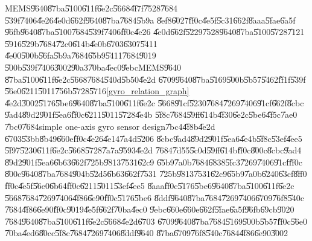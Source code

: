 MEMS\U{9640}\U{87ba}\U{5100}\U{611f}\U{6e2c}\U{5668}\U{4f7f}\U{7528}\U{7684}%
\U{539f}\U{7406}\U{4e26}\U{4e0d}\U{662f}\U{9640}\U{87ba}\U{7684}\U{5b9a}%
\U{8ef8}\U{6027}\U{ff0c}\U{4e5f}\U{5c31}\U{662f}\U{8aaa}\U{5fae}\U{6a5f}%
\U{96fb}\U{9640}\U{87ba}\U{5100}\U{7684}\U{539f}\U{7406}\U{ff0c}\U{4e26}%
\U{4e0d}\U{662f}\U{5229}\U{7528}\U{9640}\U{87ba}\U{5100}\U{5728}\U{7121}%
\U{5916}\U{529b}\U{7684}\U{72c0}\U{614b}\U{4e0b}\U{6703}\U{6307}\U{5411}%
\U{4e00}\U{500b}\U{56fa}\U{5b9a}\U{7684}\U{65b9}\U{5411}\U{7684}\U{9019}%
\U{500b}\U{539f}\U{7406}\U{3002}\U{90a3}\U{70ba}\U{4ec0}\U{9ebc}MEMS\U{9640}%
\U{87ba}\U{5100}\U{611f}\U{6e2c}\U{5668}\U{7684}\U{540d}\U{5b50}\U{4e2d}%
\U{6709}\U{9640}\U{87ba}\U{5169}\U{500b}\U{5b57}\U{5462}\U{ff1f}\U{539f}%
\U{56e0}\U{6211}\U{5011}\U{756b}\U{5728}\U{5716}\ref{gyro_relation_graph}%
\U{4e2d}\U{3002}\U{5176}\U{5be6}\U{9640}\U{87ba}\U{5100}\U{611f}\U{6e2c}%
\U{5668}\U{91cf}\U{5230}\U{7684}\U{7269}\U{7406}\U{91cf}\U{662f}\U{8cbc}%
\U{9ad4}\U{89d2}\U{901f}\U{5ea6}\U{ff0c}\U{6211}\U{5011}\U{5728}\U{4e4b}%
\U{5f8c}\U{7684}\U{59ff}\U{614b}\U{4f30}\U{6e2c}\U{5be6}\U{4f5c}\U{7ae0}%
\U{7bc0}\U{7684}simple one-axis gyro sensor design\U{7bc4}\U{4f8b}\U{4e2d}%
\U{6703}\U{53bb}\U{8b49}\U{660e}\U{ff0c}\U{4e26}\U{4e14}\U{7a4d}\U{5206}%
\U{8cbc}\U{9ad4}\U{89d2}\U{901f}\U{5ea6}\U{4e4b}\U{5f8c}\U{53ef}\U{4ee5}%
\U{5f97}\U{5230}\U{611f}\U{6e2c}\U{5668}\U{5728}\U{7a7a}\U{9593}\U{4e2d}%
\U{7684}\U{7d55}\U{5c0d}\U{59ff}\U{614b}\U{ff0c}\U{800c}\U{8cbc}\U{9ad4}%
\U{89d2}\U{901f}\U{5ea6}\U{6b63}\U{662f}\U{725b}\U{9813}\U{7531}\U{62c9}%
\U{65b9}\U{7a0b}\U{7684}\U{6838}\U{5fc3}\U{7269}\U{7406}\U{91cf}\U{ff0c}%
\U{800c}\U{9640}\U{87ba}\U{7684}\U{904b}\U{52d5}\U{6b63}\U{662f}\U{7531}%
\U{725b}\U{9813}\U{7531}\U{62c9}\U{65b9}\U{7a0b}\U{6240}\U{63cf}\U{8ff0}%
\U{ff0c}\U{4e5f}\U{56e0}\U{6b64}\U{ff0c}\U{6211}\U{5011}\U{53ef}\U{4ee5}%
\U{8aaa}\U{ff0c}\U{5176}\U{5be6}\U{9640}\U{87ba}\U{5100}\U{611f}\U{6e2c}%
\U{5668}\U{7684}\U{7269}\U{7406}\U{4f86}\U{6e90}\U{ff0c}\U{5176}\U{5be6}%
\U{8ddf}\U{9640}\U{87ba}\U{7684}\U{7269}\U{7406}\U{6709}\U{76f8}\U{540c}%
\U{7684}\U{4f86}\U{6e90}\U{ff0c}\U{9019}\U{4e5f}\U{662f}\U{70ba}\U{4ec0}%
\U{9ebc}\U{660e}\U{660e}\U{662f}\U{5fae}\U{6a5f}\U{96fb}\U{69cb}\U{9020}%
\U{7684}\U{9640}\U{87ba}\U{5100}\U{611f}\U{6e2c}\U{5668}\U{4e2d}\U{6703}%
\U{6709}\U{9640}\U{87ba}\U{7684}\U{5169}\U{500b}\U{5b57}\U{ff0c}\U{56e0}%
\U{70ba}\U{4ed6}\U{80cc}\U{5f8c}\U{7684}\U{7269}\U{7406}\U{8ddf}\U{9640}%
\U{87ba}\U{6709}\U{76f8}\U{540c}\U{7684}\U{4f86}\U{6e90}\U{3002}

\bigskip

